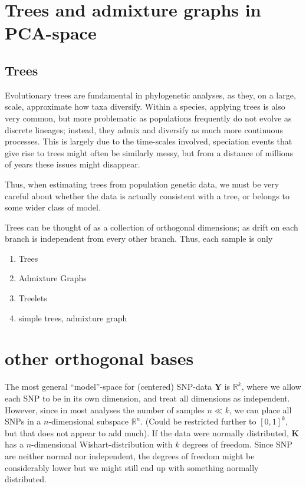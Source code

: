 \documentclass[10pt,a4paper]{article}
\newcommand{\MY}{\mathbf{Y}} %
\newcommand{\MK}{\mathbf{K}} %
\begin{document}
\section{Trees and admixture graphs in PCA-space}
\subsection{Trees}
Evolutionary trees are fundamental in phylogenetic analyses, as they, on a large, scale, approximate how taxa diversify. Within a species, applying trees is also very common, but more problematic as populations frequently do not evolve as discrete lineages; instead, they admix and diversify as much more continuous processes. This is largely due to the time-scales involved, speciation events that give rise to trees might often be similarly messy, but from a distance of millions of years these issues might disappear. 

Thus, when estimating trees from population genetic data, we must be very careful about whether the data is actually consistent with a tree, or belongs to some wider class of model.


Trees can be thought of as a collection of orthogonal dimensions; as drift on each branch is independent from every other branch. Thus, each sample is only 
\begin{enumerate}
	\item Trees
	\item Admixture Graphs
	\item Treelets
	\item simple trees, admixture graph
\end{enumerate}




\section{other orthogonal bases}
The most general ``model''-space for (centered) SNP-data $\MY$ is $\mathbb{R}^k$, where we allow each SNP to be in its own dimension, and treat all dimensions as independent. However, since in most analyses the number of samples $n \ll k$, we can place all SNPs in a $n$-dimensional subspace $\mathbb{R}^n$. (Could be restricted further to $[0,1]^k$, but that does not appear to add much).
If the data were normally distributed, $\MK$ has a $n$-dimensional Wishart-distribution with $k$ degrees of freedom. Since SNP are neither normal nor independent, the degrees of freedom might be considerably lower but we might still end up with something normally distributed.
\end{document}
